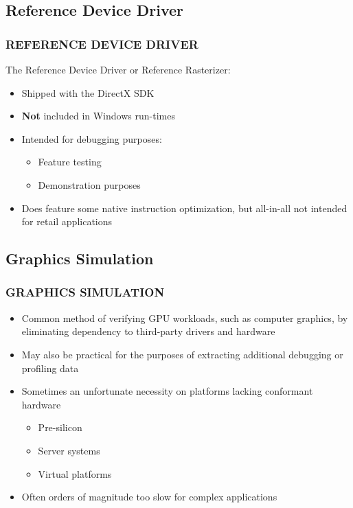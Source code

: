 \subsection{Reference Device Driver}
\begin{frame}
\frametitle{REFERENCE DEVICE DRIVER}

The Reference Device Driver or Reference Rasterizer:
\begin{itemize}
\item Shipped with the DirectX SDK
\item \textbf{Not} included in Windows run-times
\item Intended for debugging purposes:
  \begin{itemize}
  \item Feature testing
  \item Demonstration purposes
  \end{itemize}
\item Does feature some native instruction optimization, but all-in-all not intended for retail applications
\end{itemize}

\end{frame}

\subsection{Graphics Simulation}
\begin{frame}
\frametitle{GRAPHICS SIMULATION}

\begin{itemize}
\item Common method of verifying GPU workloads, such as computer graphics, by eliminating dependency to third-party drivers and hardware
\item May also be practical for the purposes of extracting additional debugging or profiling data
\item Sometimes an unfortunate necessity on platforms lacking conformant hardware
  \begin{itemize}
  \item Pre-silicon
  \item Server systems
  \item Virtual platforms
  \end{itemize}
\item Often orders of magnitude too slow for complex applications
\end{itemize}

\end{frame}

